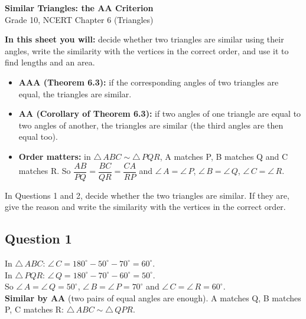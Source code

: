 \documentclass[11pt,a4paper]{article}
\newif\ifsol
\newcommand{\tri}{\triangle\,}
\newcommand{\ang}{\angle\,}
\newcommand{\workspace}{}
\newenvironment{sol}{\setbox0\vbox\bgroup}{\egroup}
\newcommand{\workspace}{\vspace{3.6cm}}
\newcommand{\q}[1]{\ifsol\needspace{11.5cm}\else\needspace{12\baselineskip}\fi\subsection*{Question #1}}
\begin{document}
\begin{center}
  {\LARGE\bfseries Similar Triangles: the AA Criterion}\\[4pt]
  {\large Grade 10, NCERT Chapter 6 (Triangles)}
\end{center}

\textbf{In this sheet you will:} decide whether two triangles are similar using their angles, write the similarity with the vertices in the correct order, and use it to find lengths and an area.

\begin{toolbox}
\begin{itemize}[leftmargin=1.2em]
  \item \textbf{AAA (Theorem 6.3):} if the corresponding angles of two triangles are equal, the triangles are similar.
  \item \textbf{AA (Corollary of Theorem 6.3):} if two angles of one triangle are equal to two angles of another, the triangles are similar (the third angles are then equal too).
  \item \textbf{Order matters:} in $\tri ABC \sim \tri PQR$, A matches P, B matches Q and C matches R. So
  $\dfrac{AB}{PQ} = \dfrac{BC}{QR} = \dfrac{CA}{RP}$ and $\ang A = \ang P$, $\ang B = \ang Q$, $\ang C = \ang R$.
\end{itemize}
\end{toolbox}

In Questions 1 and 2, decide whether the two triangles are similar. If they are, give the reason and write the similarity with the vertices in the correct order.

\q{1}
\begin{center}
\end{center}
\workspace
\begin{sol}
In $\tri ABC$: $\ang C = 180^\circ - 50^\circ - 70^\circ = 60^\circ$.\\
In $\tri PQR$: $\ang Q = 180^\circ - 70^\circ - 60^\circ = 50^\circ$.\\[2pt]
So $\ang A = \ang Q = 50^\circ$, $\ang B = \ang P = 70^\circ$ and $\ang C = \ang R = 60^\circ$.\\[2pt]
\textbf{Similar by AA} (two pairs of equal angles are enough). A matches Q, B matches P, C matches R: $\tri ABC \sim \tri QPR$.
\end{sol}
\end{document}
